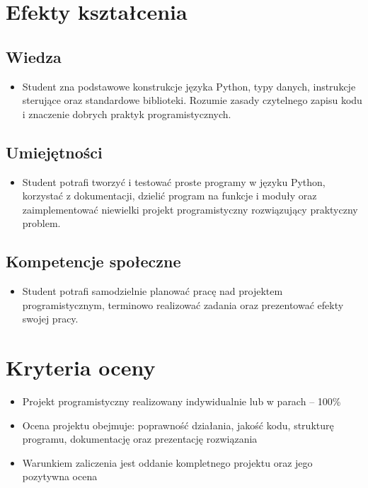 \documentclass[12pt, a4paper]{article}
\begin{document}
\section{Efekty kształcenia}

\subsection*{Wiedza}
\begin{itemize}
  \item Student zna podstawowe konstrukcje języka Python, typy danych, instrukcje sterujące oraz standardowe biblioteki. Rozumie zasady czytelnego zapisu kodu i znaczenie dobrych praktyk programistycznych.
\end{itemize}

\subsection*{Umiejętności}
\begin{itemize}
  \item Student potrafi tworzyć i testować proste programy w języku Python, korzystać z dokumentacji, dzielić program na funkcje i moduły oraz zaimplementować niewielki projekt programistyczny rozwiązujący praktyczny problem.
\end{itemize}

\subsection*{Kompetencje społeczne}
\begin{itemize}
  \item Student potrafi samodzielnie planować pracę nad projektem programistycznym, terminowo realizować zadania oraz prezentować efekty swojej pracy.
\end{itemize}

\section{Kryteria oceny}

\begin{itemize}
  \item Projekt programistyczny realizowany indywidualnie lub w parach – 100\%
  \item Ocena projektu obejmuje: poprawność działania, jakość kodu, strukturę programu, dokumentację oraz prezentację rozwiązania
  \item Warunkiem zaliczenia jest oddanie kompletnego projektu oraz jego pozytywna ocena
\end{itemize}
\end{document}
